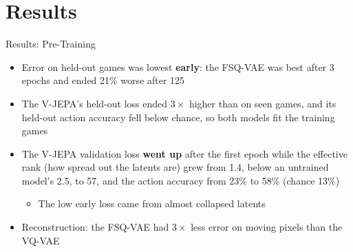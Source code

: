 \documentclass[aspectratio=43,10pt]{beamer}
\begin{document}
\section{Results}

\begin{frame}{Results: Pre-Training}
  \begin{itemize}\setlength\itemsep{0.7em}
    \item Error on held-out games was lowest \textbf{early}: the FSQ-VAE was best after 3
          epochs and ended 21\% worse after 125
    \item The V-JEPA's held-out loss ended $3\times$ higher than on seen games, and its
          held-out action accuracy fell below chance, so both models fit the training games
    \item The V-JEPA validation loss \textbf{went up} after the first epoch while the effective
          rank (how spread out the latents are) grew from 1.4, below an untrained model's 2.5,
          to 57, and the action accuracy from 23\% to 58\% (chance 13\%)
      \begin{itemize}
        \item The low early loss came from almost collapsed latents
      \end{itemize}
    \item Reconstruction: the FSQ-VAE had $3\times$ less error on moving pixels than the VQ-VAE
  \end{itemize}
\end{frame}
\end{document}
